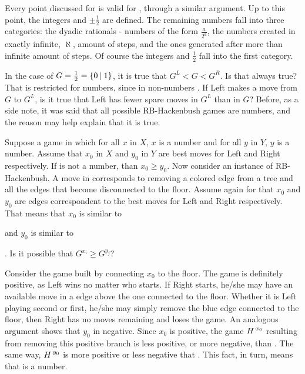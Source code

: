 Every point discussed for  is valid for , through a similar argument. Up to this point, the integers and $\pm \frac{1}{2}$ are defined. The remaining numbers fall into three categories: the dyadic rationals - numbers of the form $\frac{a}{2^k}$, the numbers created in exactly infinite, $\aleph$, amount of steps, and the ones generated after more than infinite amount of steps. Of course the integers and $\frac{1}{2}$ fall into the first category.

In the case of $\mbox{$G$} = \frac{1}{2} = \mbox{$\{0\:|\:1\}$}$, it is true that $G^L < G < G^R$. Is that always true? That is restricted for numbers, since in non-numbers . If Left makes a move from $G$ to $G^L$, is it true that Left has fewer spare moves in $G^L$ than in $G$? Before, as a side note, it was said that all possible RB-Hackenbush games are numbers, and the reason may help explain that it is true.

Suppose a game  in which for all $x$ in $X$, $x$  is a number and for all $y$ in $Y$, $y$ is a number. Assume that $x_0$ in $X$ and $y_0$ in $Y$ are best moves for Left and Right respectively. If \Gm{} is not a number, than $x_0 \ge y_0$. Now consider \Hm an instance of RB-Hackenbush. A move in \Hm corresponds to removing a colored edge from a tree and all the edges that become disconnected to the floor. Assume again for \Hm that $x_0$ and $y_0$ are edges correspondent to the best moves for Left and Right respectively. That means that $x_0$ is similar to  
 and $y_0$ is similar to 
. Is it possible that $G^{x_i} \ge G^{y_j}$?

Consider the game built by connecting $x_0$ to the floor. The game is definitely positive, as Left wins no matter who starts. If Right starts, he/she may have an available move in a edge above the one connected to the floor. Whether it is Left playing second or first, he/she may simply remove the blue edge connected to the floor, then Right has no moves remaining and loses the game. An analogous argument shows that $y_0$ in negative. Since $x_0$ is positive, the game $\mbox{$H\,$}^{x_0}$ resulting from removing this positive branch is less positive, or more negative, than \Hm. The same way, $\mbox{$H\,$}^{y_0}$ is more positive or less negative that \Hm. This fact, in turn, means that \Hm is a number.

